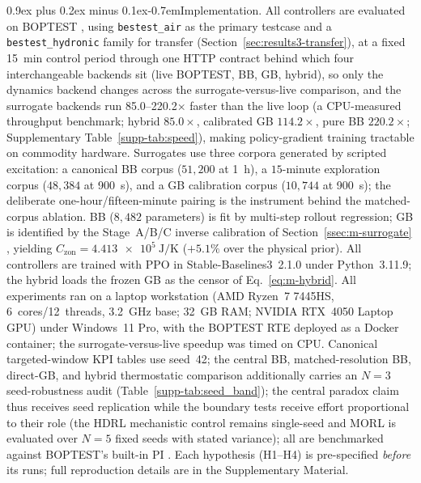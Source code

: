 \documentclass[a4paper,fleqn]{cas-sc}
\makeatletter
\renewcommand\paragraph{\@startsection{paragraph}{4}{\z@}%
 {0.9ex plus 0.2ex minus 0.1ex}{-0.7em}{\normalfont\normalsize\bfseries}}
\newcommand{\Czon}{\ensuremath{C_{\mathrm{zon}}}}
\newcommand{\suppref}[1]{\ref{supp-#1}}
\makeatother
\begin{document}
\paragraph{Implementation.}\label{sec:setup}\label{ssec:s-testbed}\label{ssec:s-data}\label{ssec:s-train}
All controllers are evaluated on BOPTEST \citep{Blum2021BOPTEST,Wetter2014Modelica,Arroyo2021GymBOPTEST}, using \texttt{bestest\_air} as the primary testcase and a \texttt{bestest\_hydronic} family for transfer (Section~\ref{sec:results3-transfer}), at a fixed \SI{15}{\minute} control period through one HTTP contract behind which four interchangeable backends sit (live BOPTEST, BB, GB, hybrid), so only the dynamics backend changes across the surrogate-versus-live comparison, and the surrogate backends run \numrange{85.0}{220.2}$\times$ faster than the live loop (a CPU-measured throughput benchmark; hybrid $85.0\times$, calibrated GB $114.2\times$, pure BB $220.2\times$; Supplementary Table~\suppref{tab:speed}), making policy-gradient training tractable on commodity hardware. Surrogates use three corpora generated by scripted excitation: a canonical BB corpus ($51{,}200$ at \SI{1}{\hour}), a $15$-minute exploration corpus ($48{,}384$ at \SI{900}{\second}), and a GB calibration corpus ($10{,}744$ at \SI{900}{\second}); the deliberate one-hour/fifteen-minute pairing is the instrument behind the matched-corpus ablation. BB ($8{,}482$ parameters) is fit by multi-step rollout regression; GB is identified by the Stage~A/B/C inverse calibration of Section~\ref{ssec:m-surrogate} \citep{Bacher2011RCIdentification}, yielding $\Czon=\SI{4.413e5}{\joule\per\kelvin}$ ($+5.1\%$ over the physical prior). All controllers are trained with PPO \citep{Schulman2017PPO} in Stable-Baselines3~2.1.0 \citep{Raffin2021SB3} under Python~3.11.9; the hybrid loads the frozen GB as the censor of Eq.~\eqref{eq:m-hybrid}. All experiments ran on a laptop workstation (AMD Ryzen~7 7445HS, 6~cores/12~threads, 3.2~GHz base; 32~GB RAM; NVIDIA RTX~4050 Laptop GPU) under Windows~11 Pro, with the BOPTEST RTE deployed as a Docker container; the surrogate-versus-live speedup was timed on CPU. Canonical targeted-window KPI tables use seed~42; the central BB, matched-resolution BB, direct-GB, and hybrid thermostatic comparison additionally carries an $N=3$ seed-robustness audit (Table~\suppref{tab:seed_band}); the central paradox claim thus receives seed replication while the boundary tests receive effort proportional to their role (the HDRL mechanistic control remains single-seed and MORL is evaluated over $N=5$ fixed seeds with stated variance); all are benchmarked against BOPTEST's built-in PI \citep{Wang2025SafeDRL}. Each hypothesis (H1--H4) is pre-specified \emph{before} its runs; full reproduction details are in the Supplementary Material.
\end{document}

